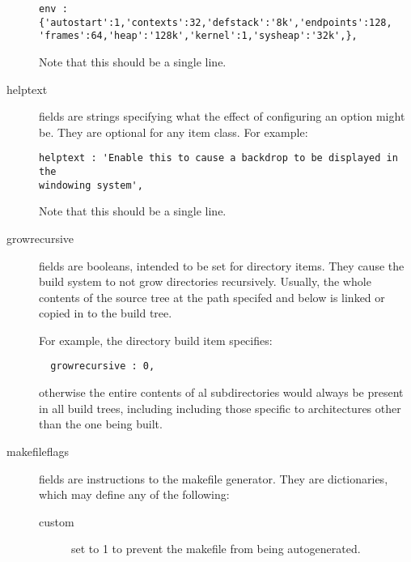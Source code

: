 \documentclass[a4paper]{article}
\newcommand{\dir}   {\begingroup \urlstyle{tt}\Url}
\begin{document}
\begin{description}
\begin{verbatim}
env : {'autostart':1,'contexts':32,'defstack':'8k','endpoints':128,
'frames':64,'heap':'128k','kernel':1,'sysheap':'32k',},
\end{verbatim}

Note that this should be a single line.


\item[helptext] fields are strings specifying what the effect of
configuring an option might be. They are optional for any item
class. For example:

\begin{verbatim}
helptext : 'Enable this to cause a backdrop to be displayed in the
windowing system',
\end{verbatim}

Note that this should be a single line.


\item[growrecursive] fields are booleans, intended to be set for
directory items. They cause the build system to not grow directories
recursively. Usually, the whole contents of the source tree at the
path specifed and below is linked or copied in to the build tree.

For example, the \dir{h} directory build item specifies:

\begin{verbatim}
  growrecursive : 0,
\end{verbatim}

otherwise the entire contents of al \dir{h} subdirectories would always be
present in all build trees, including including those specific to
architectures other than the one being built.


\item[makefileflags] fields are instructions to the makefile
generator. They are dictionaries, which may define any of the
following:

\begin{description}

\item[custom] set to 1 to prevent the makefile from being
autogenerated.


\end{description}
\end{description}
\end{document}
